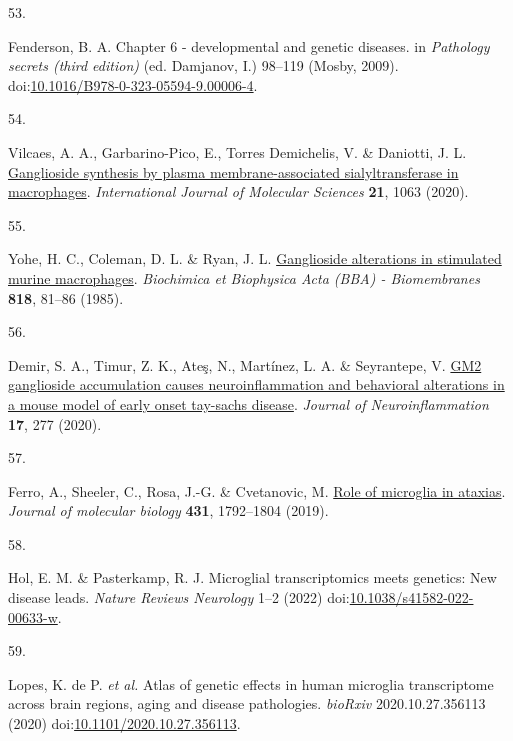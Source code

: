 \documentclass[
]{article}
\newlength{\cslhangindent}
\newlength{\csllabelwidth}
\newenvironment{CSLReferences}[2] %
 {\begin{list}{}{%
  \setlength{\itemindent}{0pt}
  \setlength{\leftmargin}{0pt}
  \setlength{\parsep}{0pt}
  \ifodd #1
   \setlength{\leftmargin}{\cslhangindent}
   \setlength{\itemindent}{-1\cslhangindent}
  \fi
  \setlength{\itemsep}{#2\baselineskip}}}
 {\end{list}}
\newcommand{\CSLLeftMargin}[1]{\parbox[t]{\csllabelwidth}{\strut#1\strut}}
\newcommand{\CSLRightInline}[1]{\parbox[t]{\linewidth - \csllabelwidth}{\strut#1\strut}}
\begin{document}
\begin{CSLReferences}{0}{0}
\CSLLeftMargin{53. }%
\CSLRightInline{Fenderson, B. A. Chapter 6 - developmental and genetic
diseases. in \emph{Pathology secrets (third edition)} (ed. Damjanov, I.)
98--119 (Mosby, 2009).
doi:\href{https://doi.org/10.1016/B978-0-323-05594-9.00006-4}{10.1016/B978-0-323-05594-9.00006-4}.}

\CSLLeftMargin{54. }%
\CSLRightInline{Vilcaes, A. A., Garbarino-Pico, E., Torres Demichelis,
V. \& Daniotti, J. L.
\href{https://doi.org/10.3390/ijms21031063}{Ganglioside synthesis by
plasma membrane-associated sialyltransferase in macrophages}.
\emph{International Journal of Molecular Sciences} \textbf{21}, 1063
(2020).}

\CSLLeftMargin{55. }%
\CSLRightInline{Yohe, H. C., Coleman, D. L. \& Ryan, J. L.
\href{https://doi.org/10.1016/0005-2736(85)90141-5}{Ganglioside
alterations in stimulated murine macrophages}. \emph{Biochimica et
Biophysica Acta (BBA) - Biomembranes} \textbf{818}, 81--86 (1985).}

\CSLLeftMargin{56. }%
\CSLRightInline{Demir, S. A., Timur, Z. K., Ateş, N., Martínez, L. A. \&
Seyrantepe, V. \href{https://doi.org/10.1186/s12974-020-01947-6}{GM2
ganglioside accumulation causes neuroinflammation and behavioral
alterations in a mouse model of early onset tay-sachs disease}.
\emph{Journal of Neuroinflammation} \textbf{17}, 277 (2020).}

\CSLLeftMargin{57. }%
\CSLRightInline{Ferro, A., Sheeler, C., Rosa, J.-G. \& Cvetanovic, M.
\href{https://doi.org/10.1016/j.jmb.2019.01.016}{Role of microglia in
ataxias}. \emph{Journal of molecular biology} \textbf{431}, 1792--1804
(2019).}

\CSLLeftMargin{58. }%
\CSLRightInline{Hol, E. M. \& Pasterkamp, R. J. Microglial
transcriptomics meets genetics: New disease leads. \emph{Nature Reviews
Neurology} 1--2 (2022)
doi:\href{https://doi.org/10.1038/s41582-022-00633-w}{10.1038/s41582-022-00633-w}.}

\CSLLeftMargin{59. }%
\CSLRightInline{Lopes, K. de P. \emph{et al.} Atlas of genetic effects
in human microglia transcriptome across brain regions, aging and disease
pathologies. \emph{bioRxiv} 2020.10.27.356113 (2020)
doi:\href{https://doi.org/10.1101/2020.10.27.356113}{10.1101/2020.10.27.356113}.}


\end{CSLReferences}
\end{document}
